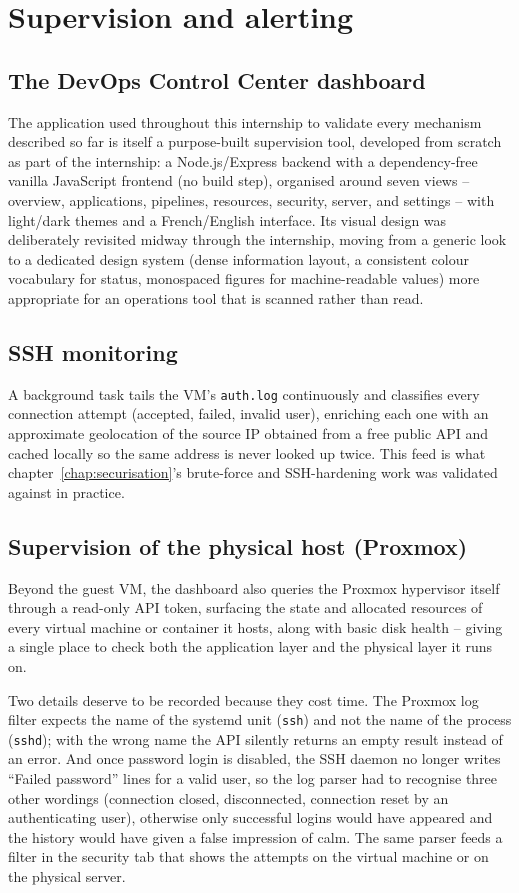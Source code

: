 \chapter{Supervision and alerting}
\label{chap:supervision}

\section{The DevOps Control Center dashboard}
The application used throughout this internship to validate every mechanism described so far is itself a purpose-built supervision tool, developed from scratch as part of the internship: a Node.js/Express backend with a dependency-free vanilla JavaScript frontend (no build step), organised around seven views -- overview, applications, pipelines, resources, security, server, and settings -- with light/dark themes and a French/English interface. Its visual design was deliberately revisited midway through the internship, moving from a generic look to a dedicated design system (dense information layout, a consistent colour vocabulary for status, monospaced figures for machine-readable values) more appropriate for an operations tool that is scanned rather than read.

\section{SSH monitoring}
A background task tails the VM's \texttt{auth.log} continuously and classifies every connection attempt (accepted, failed, invalid user), enriching each one with an approximate geolocation of the source IP obtained from a free public API and cached locally so the same address is never looked up twice. This feed is what chapter~\ref{chap:securisation}'s brute-force and SSH-hardening work was validated against in practice.

\section{Supervision of the physical host (Proxmox)}
Beyond the guest VM, the dashboard also queries the Proxmox hypervisor itself through a read-only API token, surfacing the state and allocated resources of every virtual machine or container it hosts, along with basic disk health -- giving a single place to check both the application layer and the physical layer it runs on.

Two details deserve to be recorded because they cost time. The Proxmox log filter expects the name of the systemd unit (\texttt{ssh}) and not the name of the process (\texttt{sshd}); with the wrong name the API silently returns an empty result instead of an error. And once password login is disabled, the SSH daemon no longer writes ``Failed password'' lines for a valid user, so the log parser had to recognise three other wordings (connection closed, disconnected, connection reset by an authenticating user), otherwise only successful logins would have appeared and the history would have given a false impression of calm. The same parser feeds a filter in the security tab that shows the attempts on the virtual machine or on the physical server.

